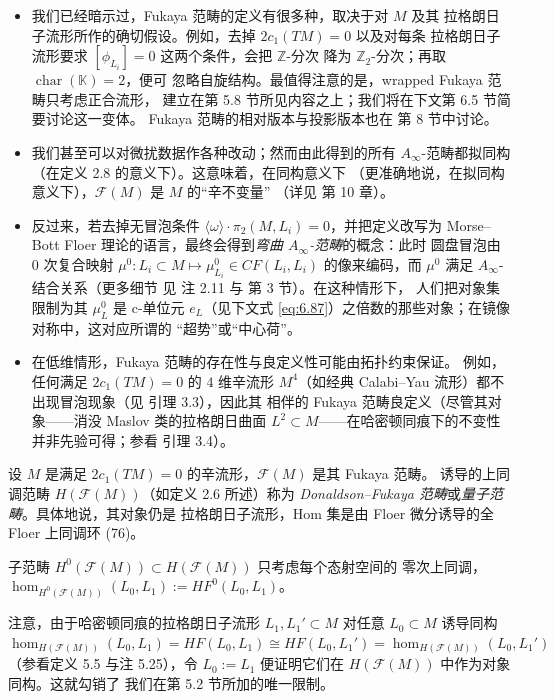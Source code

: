 \begin{Rem}\label{rem:6.14}
\begin{itemize}
  \item 我们已经暗示过，Fukaya 范畴的定义有很多种，取决于对 $M$ 及其
  拉格朗日子流形所作的确切假设。例如，去掉 $2c_1(TM)=0$ 以及对每条
  拉格朗日子流形要求 $[\phi_{L_i}]=0$ 这两个条件，会把 $\mathbb Z$-分次
  降为 $\mathbb Z_2$-分次；再取 $\operatorname{char}(\mathbb K)=2$，便可
  忽略自旋结构。最值得注意的是，wrapped Fukaya 范畴只考虑正合流形，
  建立在第 5.8 节所见内容之上；我们将在下文第 6.5 节简要讨论这一变体。
  Fukaya 范畴的相对版本与投影版本也在 \cite{Sei13} 第 8 节中讨论。
  \item 我们甚至可以对微扰数据作各种改动；然而由此得到的所有
  $A_\infty$-范畴都拟同构（在定义 2.8 的意义下）。这意味着，在同构意义下
  （更准确地说，在拟同构意义下），$\mathcal F(M)$ 是 $M$ 的“辛不变量”
  （详见 \cite{Sei08} 第 10 章）。
  \item 反过来，若去掉无冒泡条件
  $\langle\omega\rangle\cdot\pi_2(M,L_i)=0$，并把定义改写为 Morse--Bott
  Floer 理论的语言，最终会得到\emph{弯曲 $A_\infty$-范畴}的概念：此时
  圆盘冒泡由 $0$ 次复合映射 $\mu^0:L_i\subset M\mapsto\mu^0_{L_i}\in
  CF(L_i,L_i)$ 的像来编码，而 $\mu^0$ 满足 $A_\infty$-结合关系（更多细节
  见 \cite{Aur13} 注 2.11 与 \cite{Fuk02a} 第 3 节）。在这种情形下，
  人们把对象集限制为其 $\mu^0_L$ 是 c-单位元 $e_L$（见下文式
  \eqref{eq:6.87}）之倍数的那些对象；在镜像对称中，这对应所谓的
  “超势”或“中心荷”。
  \item 在低维情形，Fukaya 范畴的存在性与良定义性可能由拓扑约束保证。
  例如，任何满足 $2c_1(TM)=0$ 的 $4$ 维辛流形 $M^4$（如经典
  Calabi--Yau 流形）都不出现冒泡现象（见 \cite{AS09} 引理 3.3），因此其
  相伴的 Fukaya 范畴良定义（尽管其对象——消没 Maslov 类的拉格朗日曲面
  $L^2\subset M$——在哈密顿同痕下的不变性并非先验可得；参看 \cite{AS09}
  引理 3.4）。
\end{itemize}
\end{Rem}

\begin{Def}\label{def:6.15}
设 $M$ 是满足 $2c_1(TM)=0$ 的辛流形，$\mathcal F(M)$ 是其 Fukaya 范畴。
诱导的上同调范畴 $H(\mathcal F(M))$（如定义 2.6 所述）称为
\emph{Donaldson--Fukaya 范畴}或\emph{量子范畴}。具体地说，其对象仍是
拉格朗日子流形，Hom 集是由 Floer 微分诱导的全 Floer 上同调环 (76)。

子范畴 $H^0(\mathcal F(M))\subset H(\mathcal F(M))$ 只考虑每个态射空间的
零次上同调，$\hom_{H^0(\mathcal F(M))}(L_0,L_1):=HF^0(L_0,L_1)$。

注意，由于哈密顿同痕的拉格朗日子流形 $L_1,L_1'\subset M$ 对任意
$L_0\subset M$ 诱导同构
$\hom_{H(\mathcal F(M))}(L_0,L_1)=HF(L_0,L_1)\cong HF(L_0,L_1')
=\hom_{H(\mathcal F(M))}(L_0,L_1')$（参看定义 5.5 与注 5.25），令
$L_0:=L_1$ 便证明它们在 $H(\mathcal F(M))$ 中作为对象同构。这就勾销了
我们在第 5.2 节所加的唯一限制。
\end{Def}

